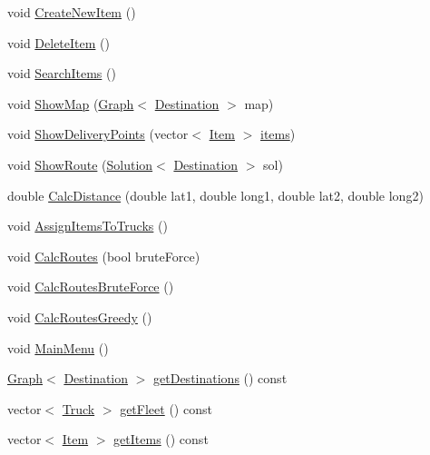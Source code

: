 \begin{DoxyCompactItemize}
\item 
void \hyperlink{class_company_ae1c6387bd19d79457cdb6d892e2e8f84}{Create\+New\+Item} ()
\item 
void \hyperlink{class_company_a9b022d1c50c3dc1c4255779c626d1aea}{Delete\+Item} ()
\item 
void \hyperlink{class_company_af134660a3ea77d61fa26f3aa5f1c1ac1}{Search\+Items} ()
\item 
void \hyperlink{class_company_ad434315ec4c1b1ba2c7a993927ff8b27}{Show\+Map} (\hyperlink{class_graph}{Graph}$<$ \hyperlink{class_destination}{Destination} $>$ map)
\item 
void \hyperlink{class_company_a4b57c8f1d6e8104902aa9f7ccff34da1}{Show\+Delivery\+Points} (vector$<$ \hyperlink{class_item}{Item} $>$ \hyperlink{class_company_ae8deb7528491726ce9d7f708ac4b573f}{items})
\item 
void \hyperlink{class_company_a4d8756bccc8a9c09c64f6e8b865d4936}{Show\+Route} (\hyperlink{struct_solution}{Solution}$<$ \hyperlink{class_destination}{Destination} $>$ sol)
\item 
double \hyperlink{class_company_acd997232441d4864a78171a94ea224d4}{Calc\+Distance} (double lat1, double long1, double lat2, double long2)
\item 
void \hyperlink{class_company_aed2297d6ef23fcb856949e71ac3b2232}{Assign\+Items\+To\+Trucks} ()
\item 
void \hyperlink{class_company_a8f768044af804983b36d25d4c31d34cc}{Calc\+Routes} (bool brute\+Force)
\item 
void \hyperlink{class_company_a39bfbc6302cd01d21105413086bd95da}{Calc\+Routes\+Brute\+Force} ()
\item 
void \hyperlink{class_company_a902b230a634cf369612dd4c6d67c9288}{Calc\+Routes\+Greedy} ()
\item 
void \hyperlink{class_company_a293db497700dd7dc96994bedb41f7e2b}{Main\+Menu} ()
\item 
\hyperlink{class_graph}{Graph}$<$ \hyperlink{class_destination}{Destination} $>$ \hyperlink{class_company_a2fe3b4810fc9312fae4a534925a5c300}{get\+Destinations} () const 
\item 
vector$<$ \hyperlink{class_truck}{Truck} $>$ \hyperlink{class_company_a7022ee40ce49cea9d4fbea169d9e1fa8}{get\+Fleet} () const 
\item 
vector$<$ \hyperlink{class_item}{Item} $>$ \hyperlink{class_company_ae5008c2b31b7a86c318047682b351ab6}{get\+Items} () const 
\end{DoxyCompactItemize}
